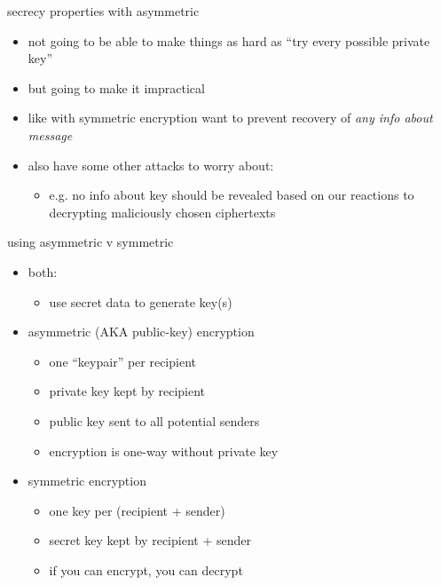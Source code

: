 \begin{frame}{secrecy properties with asymmetric}
    \begin{itemize}
    \item not going to be able to make things as hard as ``try every possible private key''
    \item but going to make it impractical
    \vspace{.5cm}
    \item like with symmetric encryption want to prevent recovery of \textit{any info about message}
    \item also have some other attacks to worry about:
        \begin{itemize}
        \item e.g. no info about key should be revealed based on our reactions to decrypting maliciously chosen ciphertexts
        \end{itemize}
    \end{itemize}
\end{frame}

\begin{frame}{using asymmetric v symmetric}
\begin{itemize}
    \item both:
        \begin{itemize}
            \item use secret data to generate key(s)
        \end{itemize}
    \item asymmetric (AKA public-key) encryption
        \begin{itemize}
            \item one ``keypair'' per recipient
            \item private key kept by recipient
            \item public key sent to all potential senders
            \item encryption is one-way without private key
        \end{itemize}
    \item symmetric encryption
        \begin{itemize}
            \item one key per (recipient + sender)
            \item secret key kept by recipient + sender
            \item if you can encrypt, you can decrypt
        \end{itemize}
\end{itemize}
\end{frame}

